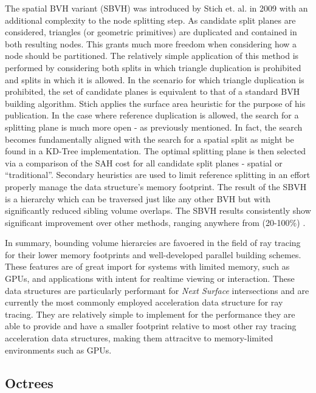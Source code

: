 The spatial BVH variant (SBVH) was introduced by Stich et. al. in 2009
\cite{Stich_2009} with an additional complexity to the node splitting step. As
candidate split planes are considered, triangles (or
geometric primitives) are duplicated and contained in both resulting nodes. This grants much
more freedom when considering how a node should be partitioned. The relatively simple application of this
method is performed by considering both splits in which triangle duplication is
prohibited and splits in which it is allowed. In the scenario for which triangle
duplication is prohibited, the set of candidate planes is equivalent to that of
a standard BVH building algorithm. Stich applies the surface area heuristic for
the purpose of his publication. In the case where reference duplication is
allowed, the search for a splitting plane is much more open - as previously
mentioned. In fact, the search becomes fundamentally aligned with the search for
a spatial split as might be found in a KD-Tree implementation. The optimal
splitting plane is then selected via a comparison of the SAH cost for all
candidate split planes - spatial or ``traditional''. Secondary heuristics are used
to limit reference splitting in an effort properly manage the data structure's
memory footprint. The result of the SBVH is a hierarchy which can be traversed
just like any other BVH but with significantly reduced sibling volume
overlaps. The SBVH results consistently show significant improvement over other
methods, ranging anywhere from (20-100\%) \cite{Stich_2009}.

In summary, bounding volume hierarcies are favoered in the field of ray tracing
for their lower memory footprints and well-developed parallel building
schemes. These features are of great import for systems with limited memory,
such as GPUs, and applications with intent for realtime viewing or
interaction. These data structures are particularly performant for \textit{Next
  Surface} intersections and are currently the most commonly employed
acceleration data structure for ray tracing. They are relatively simple to
implement for the performance they are able to provide and have a smaller
footprint relative to most other ray tracing acceleration data structures,
making them attracitve to memory-limited environments such as GPUs.

\subsection{Octrees}%
\label{subsec:octree}

